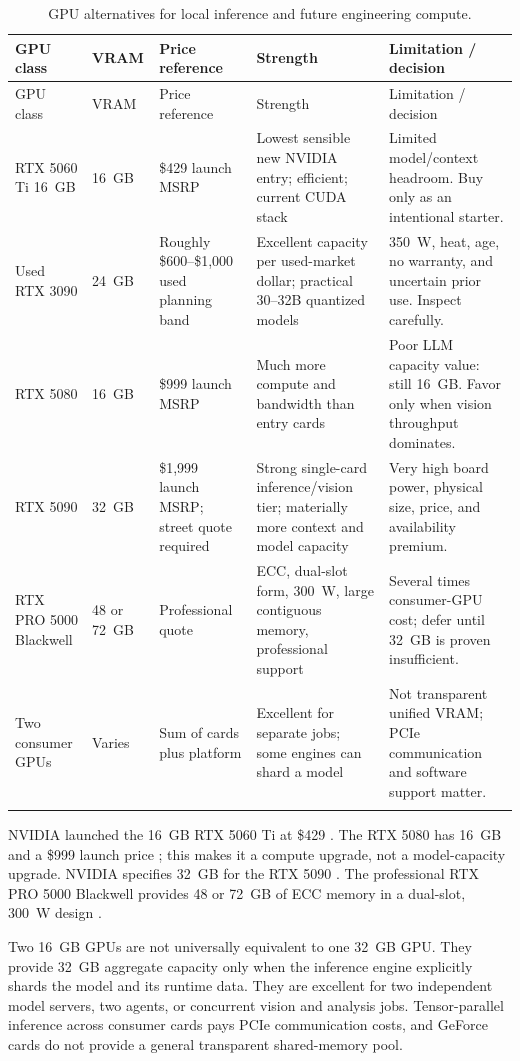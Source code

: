 \documentclass[11pt]{article}
\begin{document}
\begin{longtable}{L{0.15\textwidth} L{0.09\textwidth} L{0.13\textwidth} L{0.18\textwidth} L{0.25\textwidth}}
\toprule
GPU class & VRAM & Price reference & Strength & Limitation / decision \\
\midrule
\endfirsthead
\toprule
GPU class & VRAM & Price reference & Strength & Limitation / decision \\
\midrule
\endhead
RTX 5060 Ti 16~GB & 16~GB & \$429 launch MSRP & Lowest sensible new NVIDIA entry; efficient; current CUDA stack & Limited model/context headroom. Buy only as an intentional starter. \\
Used RTX 3090 & 24~GB & Roughly \$600--\$1,000 used planning band & Excellent capacity per used-market dollar; practical 30--32B quantized models & 350~W, heat, age, no warranty, and uncertain prior use. Inspect carefully. \\
RTX 5080 & 16~GB & \$999 launch MSRP & Much more compute and bandwidth than entry cards & Poor LLM capacity value: still 16~GB. Favor only when vision throughput dominates. \\
RTX 5090 & 32~GB & \$1,999 launch MSRP; street quote required & Strong single-card inference/vision tier; materially more context and model capacity & Very high board power, physical size, price, and availability premium. \\
RTX PRO 5000 Blackwell & 48 or 72~GB & Professional quote & ECC, dual-slot form, 300~W, large contiguous memory, professional support & Several times consumer-GPU cost; defer until 32~GB is proven insufficient. \\
Two consumer GPUs & Varies & Sum of cards plus platform & Excellent for separate jobs; some engines can shard a model & Not transparent unified VRAM; PCIe communication and software support matter. \\
\bottomrule
\caption{GPU alternatives for local inference and future engineering compute.}
\end{longtable}

NVIDIA launched the 16~GB RTX 5060 Ti at \$429 \cite{nvidia_5060ti}. The RTX
5080 has 16~GB and a \$999 launch price \cite{nvidia_5080}; this makes it a
compute upgrade, not a model-capacity upgrade. NVIDIA specifies 32~GB for the
RTX 5090 \cite{nvidia_5090}. The professional RTX PRO 5000 Blackwell provides
48 or 72~GB of ECC memory in a dual-slot, 300~W design
\cite{nvidia_rtx_pro_5000}.

\begin{warningbox}
Two 16~GB GPUs are not universally equivalent to one 32~GB GPU. They provide
32~GB aggregate capacity only when the inference engine explicitly shards the
model and its runtime data. They are excellent for two independent model
servers, two agents, or concurrent vision and analysis jobs. Tensor-parallel
inference across consumer cards pays PCIe communication costs, and GeForce
cards do not provide a general transparent shared-memory pool.
\end{warningbox}
\end{document}
